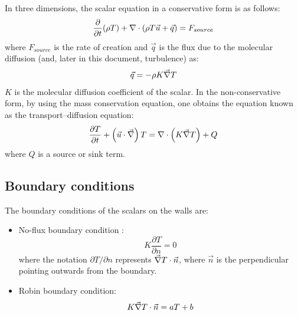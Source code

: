 In three dimensions, the scalar equation in a conservative form is as follows:%
\begin{equation}
  \dfrac{\partial}{\partial t}(\rho T)+\Div(\rho T\vec{u}+\vec{q})=F_{source}%
\end{equation}
where $F_{source}$ is the rate of creation and $\vec{q}$ is the flux due to
the molecular diffusion (and, later in this document, turbulence) as:%
\begin{equation}
  \vec{q}=-\rho K \vec \nabla T
\end{equation}
$K$ is the molecular diffusion coefficient of the scalar.
In the non-conservative form, by using the mass conservation equation, one
obtains the equation known as the transport--diffusion equation:%
\begin{equation}\label{eq:transport_scalaire}
  \dfrac{\partial T}{\partial t}+\left(\vec{u}\cdot\vec \nabla\right) T =
  \nabla \cdot\left(K\vec \nabla T\right)+Q
\end{equation}
where $Q$ is a source or sink term.


\subsection{\label{traceurs 3D limites}Boundary conditions}

The boundary conditions of the scalars on the walls are:
\begin{itemize}
\item No-flux boundary condition :
\begin{equation}
  K\dfrac{\partial T}{\partial n}=0
\end{equation}
where the notation $\partial T/\partial n$ represents
$\vec \nabla T\cdot\vec{n}$, where $\vec{n}$
is the perpendicular pointing outwards from the boundary.

\item Robin boundary condition:
\begin{equation}
  K\vec \nabla T\cdot\vec{n}=aT+b
\end{equation}
\end{itemize}


